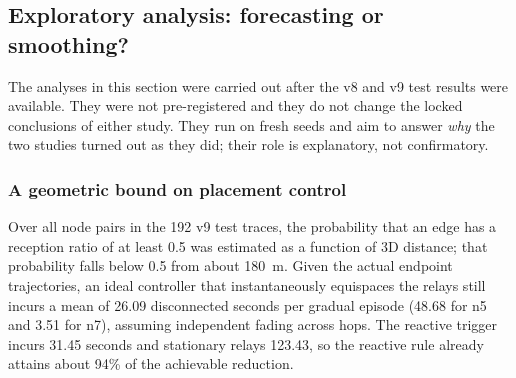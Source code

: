 \subsection{Exploratory analysis: forecasting or smoothing?}\label{sec:posthoc}
The analyses in this section were carried out after the v8 and v9 test results
were available. They were not pre-registered and they do not change the locked
conclusions of either study. They run on fresh seeds and aim to answer
\emph{why} the two studies turned out as they did; their role is explanatory,
not confirmatory.

\subsubsection{A geometric bound on placement control}
Over all node pairs in the 192 v9 test traces, the probability that an edge has
a reception ratio of at least 0.5 was estimated as a function of 3D distance;
that probability falls below 0.5 from about 180~m. Given the actual endpoint
trajectories, an ideal controller that instantaneously equispaces the relays
still incurs a mean of 26.09 disconnected seconds per gradual episode (48.68 for
n5 and 3.51 for n7), assuming independent fading across hops. The reactive
trigger incurs 31.45 seconds and stationary relays 123.43, so the reactive rule
already attains about 94\% of the achievable reduction.


